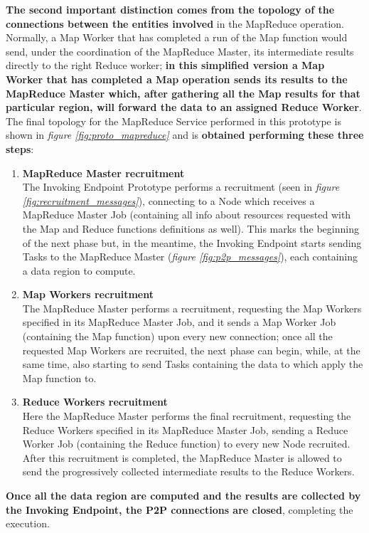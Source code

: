 \textbf{The second important distinction comes from the topology of the connections between the entities involved} in the MapReduce operation. Normally, a Map Worker that has completed a run of the Map function would send, under the coordination of the MapReduce Master, its intermediate results directly to the right Reduce worker; \textbf{in this simplified version a Map Worker that has completed a Map operation sends its results to the MapReduce Master which, after gathering all the Map results for that particular region, will forward the data to an assigned Reduce Worker}. The final topology for the MapReduce Service performed in this prototype is shown in \textit{figure \ref{fig:proto_mapreduce}} and is \textbf{obtained performing these three steps}:
\begin{enumerate}
    \item \textbf{MapReduce Master recruitment}\\
    The Invoking Endpoint Prototype performs a recruitment (seen in \textit{figure \ref{fig:recruitment_messages}}), connecting to a Node which receives a MapReduce Master Job (containing all info about resources requested with the Map and Reduce functions definitions as well). This marks the beginning of the next phase but, in the meantime, the Invoking Endpoint starts sending Tasks to the MapReduce Master (\textit{figure \ref{fig:p2p_messages}}), each containing a data region to compute.
    \item \textbf{Map Workers recruitment}\\
    The MapReduce Master performs a recruitment, requesting the Map Workers specified in its MapReduce Master Job, and it sends a Map Worker Job (containing the Map function) upon every new connection; once all the requested Map Workers are recruited, the next phase can begin, while, at the same time, also starting to send Tasks containing the data to which apply the Map function to.
    \item \textbf{Reduce Workers recruitment}\\
    Here the MapReduce Master performs the final recruitment, requesting the Reduce Workers specified in its MapReduce Master Job, sending a Reduce Worker Job (containing the Reduce function) to every new Node recruited. After this recruitment is completed, the MapReduce Master is allowed to send the progressively collected intermediate results to the Reduce Workers. 
\end{enumerate}

\textbf{Once all the data region are computed and the results are collected by the Invoking Endpoint, the P2P connections are closed}, completing the execution.

